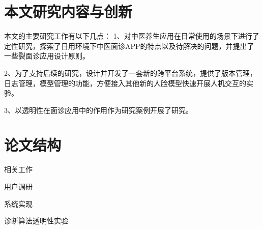 








\section{本文研究内容与创新}

本文的主要研究工作有以下几点：
1、对中医养生应用在日常使用的场景下进行了定性研究，探索了日用环境下中医面诊APP的特点以及待解决的问题，并提出了一些裂面诊应用设计原则。

2、为了支持后续的研究，设计并开发了一套新的跨平台系统，提供了版本管理，日志管理，模型管理的功能，方便接入其他新的人脸模型快速开展人机交互的实验。

3、以透明性在面诊应用中的作用作为研究案例开展了研究。















\section{论文结构}

相关工作

用户调研
    
系统实现

诊断算法透明性实验